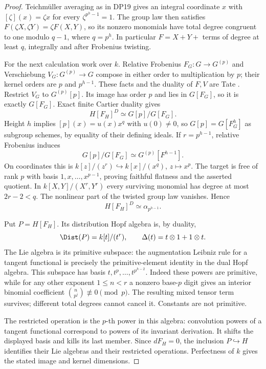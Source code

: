 \begin{proof}
Teichm\"uller averaging as in DP19 gives an integral coordinate $x$ with $[\zeta](x)=\zeta x$ for every $\zeta^{p^h-1}=1$. The group law then satisfies $F(\zeta X,\zeta Y)=\zeta F(X,Y)$, so its nonzero monomials have total degree congruent to one modulo $q-1$, where $q=p^h$. In particular $F=X+Y+$ terms of degree at least $q$, integrally and after Frobenius twisting.

For the next calculation work over $k$. Relative Frobenius $F_G:G\to G^{(p)}$ and Verschiebung $V_G:G^{(p)}\to G$ compose in either order to multiplication by $p$; their kernel orders are $p$ and $p^{h-1}$. These facts and the duality of $F,V$ are Tate \cite[\S2.2, diagram (3), pp.~163--164; \S2.3, Proposition 3, p.~166]{Tate67}. Restrict $V_G$ to $G^{(p)}[p]$. Its image has order $p$ and lies in $G[F_G]$, so it is exactly $G[F_G]$. Exact finite Cartier duality \cite[\S1.2--1.3, pp.~159--160]{Tate67} gives
\[
 H[F_H]^D\simeq G[p]/G[F_G].
\]
Height $h$ implies $[p](x)=u(x)x^q$ with $u(0)\ne0$, so $G[p]=G[F_G^h]$ as subgroup schemes, by equality of their defining ideals. If $r=p^{h-1}$, relative Frobenius induces
\[
 G[p]/G[F_G]\simeq G^{(p)}[F^{h-1}].
\]
On coordinates this is $k[z]/(z^r)\hookrightarrow k[x]/(x^q)$, $z\mapsto x^p$. The target is free of rank $p$ with basis $1,x,\ldots,x^{p-1}$, proving faithful flatness and the asserted quotient. In $k[X,Y]/(X^r,Y^r)$ every surviving monomial has degree at most $2r-2<q$. The nonlinear part of the twisted group law vanishes. Hence
\begin{equation}\label{eq:dual-F-kernel}
 H[F_H]^D\simeq\alpha_{p^{h-1}}.
\end{equation}

Put $P=H[F_H]$. Its distribution Hopf algebra is, by duality,
\[
 \Dist(P)=k[t]/(t^r),\qquad\Delta(t)=t\otimes1+1\otimes t.
\]
The Lie algebra is its primitive subspace: the augmentation Leibniz rule for a tangent functional is precisely the primitive-element identity in the dual Hopf algebra. This subspace has basis $t,t^p,\ldots,t^{p^{h-2}}$. Indeed these powers are primitive, while for any other exponent $1\le n<r$ a nonzero base-$p$ digit gives an interior binomial coefficient $\binom n{p^j}\not\equiv0\pmod p$. The resulting mixed tensor term survives; different total degrees cannot cancel it. Constants are not primitive.

The restricted operation is the $p$-th power in this algebra: convolution powers of a tangent functional correspond to powers of its invariant derivation. It shifts the displayed basis and kills its last member. Since $dF_H=0$, the inclusion $P\hookrightarrow H$ identifies their Lie algebras and their restricted operations. Perfectness of $k$ gives the stated image and kernel dimensions.


\end{proof}
